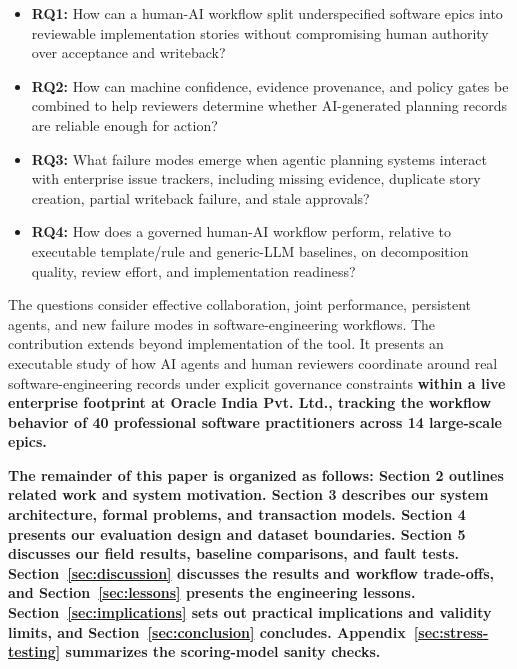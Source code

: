 \documentclass[manuscript,review]{acmart}
\begin{document}
\begin{itemize}
    \item \textbf{RQ1:} How can a human-AI workflow split underspecified software epics into reviewable implementation stories without compromising human authority over acceptance and writeback?
    \item \textbf{RQ2:} How can machine confidence, evidence provenance, and policy gates be combined to help reviewers determine whether AI-generated planning records are reliable enough for action?
    \item \textbf{RQ3:} What failure modes emerge when agentic planning systems interact with enterprise issue trackers, including missing evidence, duplicate story creation, partial writeback failure, and stale approvals?
    \item \textbf{RQ4:} How does a governed human-AI workflow perform, relative to executable template/rule and generic-LLM baselines, on decomposition quality, review effort, and implementation readiness?
\end{itemize}

The questions consider effective collaboration, joint performance, persistent agents, and new failure modes in software-engineering workflows. The contribution extends beyond implementation of the tool. It presents an executable study of how AI agents and human reviewers coordinate around real software-engineering records under explicit governance constraints \textbf{within a live enterprise footprint at Oracle India Pvt. Ltd., tracking the workflow behavior of 40 professional software practitioners across 14 large-scale epics.}

\textbf{The remainder of this paper is organized as follows: Section 2 outlines related work and system motivation. Section 3 describes our system architecture, formal problems, and transaction models. Section 4 presents our evaluation design and dataset boundaries. Section 5 discusses our field results, baseline comparisons, and fault tests. Section~\ref{sec:discussion} discusses the results and workflow trade-offs, and Section~\ref{sec:lessons} presents the engineering lessons. Section~\ref{sec:implications} sets out practical implications and validity limits, and Section~\ref{sec:conclusion} concludes. Appendix~\ref{sec:stress-testing} summarizes the scoring-model sanity checks.}
\end{document}
